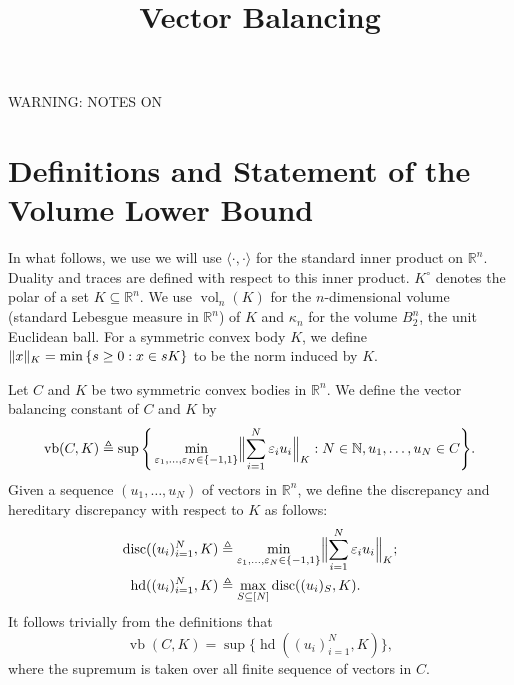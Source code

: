 \documentclass[12pt]{article}
\newcommand{\R}{{\mathbb{R}}}
\newcommand{\T}{\mathsf T}
\newcommand\eps{\varepsilon}
\newcommand{\eqdef}{\triangleq}
\newcommand{\inner}[2]{\langle #1, #2 \rangle}
\newcommand{\set}[1]{\left\{ #1 \right\}}
\DeclareMathOperator{\vollb}{volLB}
\DeclareMathOperator{\disc}{disc}
\DeclareMathOperator{\hd}{hd}
\DeclareMathOperator{\vb}{vb}
\DeclareMathOperator{\vol}{vol}
\DeclareMathOperator{\lspan}{span}
\DeclarePairedDelimiter\norm{\lVert}{\rVert}
\newcommand{\noteswarning}{{\begin{center} {\Large WARNING: NOTES ON}\end{center}}}
\newcommand{\noteswarning}{{}}
\begin{document}
\title{Vector Balancing}
\maketitle

\noteswarning


\section{Definitions and Statement of the Volume Lower Bound}

In what follows, we use we will use $\inner{\cdot}{\cdot}$ for the standard
inner product on $\R^n$. Duality and traces are defined with respect to this
inner product. $K^\circ$ denotes the polar of a set $K \subseteq \R^n$. We use
$\vol_n(K)$ for the $n$-dimensional volume (standard Lebesgue measure in $\R^n$)
of $K$ and $\kappa_n$ for the volume $B_2^n$, the unit Euclidean ball. For a
symmetric convex body $K$, we define $\norm{x}_K = \min \set{s \geq 0: x \in sK}$
to be the norm induced by $K$.

Let $C$ and $K$ be two symmetric convex bodies in $\R^n$. We define the vector
balancing constant of $C$ and $K$ by 
\[
\vb(C, K) \eqdef \sup\Bigg\{ 
\min_{\eps_1, \ldots,\eps_N \in \{-1, 1\}} \Bigl\|\sum_{i = 1}^N \eps_i
u_i \Bigr\|_{K}: N \in \mathbb{N}, u_1, \ldots, u_N \in C \Bigg\}.
\]
Given a sequence $(u_1, \ldots, u_N)$ of vectors in $\R^n$, we define the
discrepancy and hereditary discrepancy with respect to $K$ as follows:
\begin{align*}
\disc((u_i)_{i = 1}^N,K) &\eqdef \min_{\eps_1, \ldots,\eps_N \in
  \{-1, 1\}}
\Bigl\|\sum_{i = 1}^N{\eps_i u_i}\Bigr\|_{K};\\
\hd((u_i)_{i = 1}^N, K) &\eqdef \max_{S \subseteq  [N]}{\disc((u_i)_S, K)}.
\end{align*}
It follows trivially from the definitions that 
\[
\vb(C, K) = \sup\{\hd((u_i)_{i = 1}^N, K)\},
\]
where the supremum is taken over all finite sequence of vectors in $C$.

\end{document}
